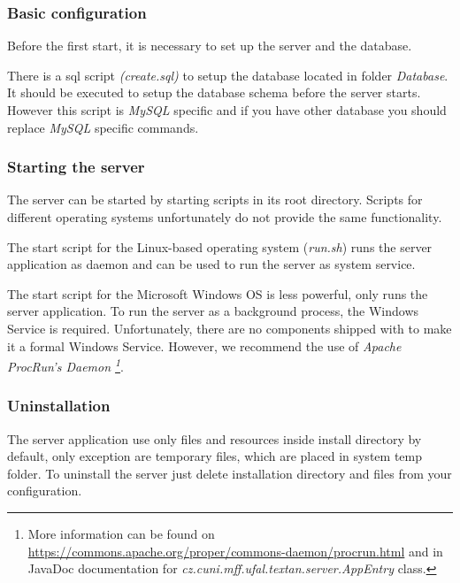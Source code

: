 \subsubsection{Basic configuration}

Before the first start, it is necessary to set up the server and the database.



There is a sql script \emph{(create.sql)} to setup the database located in folder  \emph{Database}. It should be executed to setup the database schema before the server starts. However this script is \emph{MySQL} specific  and if you have other database you should replace \emph{MySQL} specific commands.

\subsubsection{Starting the server}

The server can be started by starting scripts in its root directory. Scripts for
different operating systems unfortunately do not provide the same functionality.

The start script for the Linux-based operating system (\emph{run.sh}) runs the
server application as daemon and can be used to run the server as system service.

The start script for the Microsoft Windows OS is less powerful, only runs the
server application. To run the server as a background process, the Windows Service
is required. Unfortunately, there are no components shipped with \textan{}
to make it a formal Windows Service. However, we recommend the use of \emph{Apache
ProcRun's Daemon \footnote{More information can be found on
\url{https://commons.apache.org/proper/commons-daemon/procrun.html} and in JavaDoc
documentation for \emph{cz.cuni.mff.ufal.textan.server.AppEntry} class.}}.

\subsubsection{Uninstallation}
The server application use only files and resources inside install directory by
default, only exception are temporary files, which are placed in system temp folder.
To uninstall the server just delete installation directory and files from your
configuration.

